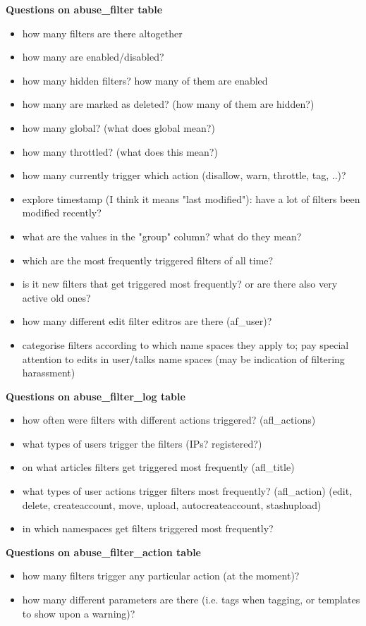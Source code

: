 \documentclass{sigchi}
\begin{document}
\textbf{Questions on abuse\_filter table}
\begin{itemize}
    \item how many filters are there altogether
    \item how many are enabled/disabled?
    \item how many hidden filters? how many of them are enabled
    \item how many are marked as deleted? (how many of them are hidden?)
    \item how many global? (what does global mean?)
    \item how many throttled? (what does this mean?)
    \item how many currently trigger which action (disallow, warn, throttle, tag, ..)?
    \item explore timestamp (I think it means "last modified"): have a lot of filters been modified recently?
    \item what are the values in the "group" column? what do they mean?
    \item which are the most frequently triggered filters of all time?
    \item is it new filters that get triggered most frequently? or are there also very active old ones?
    \item how many different edit filter editros are there (af\_user)?
    \item categorise filters according to which name spaces they apply to; pay special attention to edits in user/talks name spaces (may be indication of filtering harassment)
\end{itemize}

\textbf{Questions on abuse\_filter\_log table}
\begin{itemize}
    \item how often were filters with different actions triggered? (afl\_actions)
    \item what types of users trigger the filters (IPs? registered?)
    \item on what articles filters get triggered most frequently (afl\_title)
    \item what types of user actions trigger filters most frequently? (afl\_action) (edit, delete, createaccount, move, upload, autocreateaccount, stashupload)
    \item in which namespaces get filters triggered most frequently?
\end{itemize}

\textbf{Questions on abuse\_filter\_action table}
\begin{itemize}
    \item how many filters trigger any particular action (at the moment)?
    \item how many different parameters are there (i.e. tags when tagging, or templates to show upon a warning)?
\end{itemize}
\end{document}
